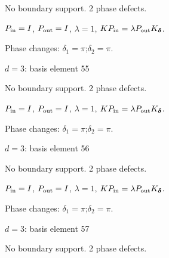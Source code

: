 No boundary support. 2 phase defects.
\begin{center}
\end{center}
\vspace{-1mm}
$P_{\rm in}=I$, \quad $P_{\rm out}=I$, \quad $\lambda=1$, \qquad $K P_{\rm in}=\lambda P_{\rm out}K_{\boldsymbol\delta}$.
\par\smallskip\begin{minipage}{.98\linewidth}\small Phase changes: $\delta_{1}=\pi$;\quad $\delta_{2}=\pi$.\end{minipage}
\vfill
{\footnotesize\texttt{}}
\newpage
{}
{\Large $d=3$: basis element 55}\par
No boundary support. 2 phase defects.
\begin{center}
\end{center}
\vspace{-1mm}
$P_{\rm in}=I$, \quad $P_{\rm out}=I$, \quad $\lambda=1$, \qquad $K P_{\rm in}=\lambda P_{\rm out}K_{\boldsymbol\delta}$.
\par\smallskip\begin{minipage}{.98\linewidth}\small Phase changes: $\delta_{1}=\pi$;\quad $\delta_{2}=\pi$.\end{minipage}
\vfill
{\footnotesize\texttt{}}
\newpage
{}
{\Large $d=3$: basis element 56}\par
No boundary support. 2 phase defects.
\begin{center}
\end{center}
\vspace{-1mm}
$P_{\rm in}=I$, \quad $P_{\rm out}=I$, \quad $\lambda=1$, \qquad $K P_{\rm in}=\lambda P_{\rm out}K_{\boldsymbol\delta}$.
\par\smallskip\begin{minipage}{.98\linewidth}\small Phase changes: $\delta_{1}=\pi$;\quad $\delta_{2}=\pi$.\end{minipage}
\vfill
{\footnotesize\texttt{}}
\newpage
{}
{\Large $d=3$: basis element 57}\par
No boundary support. 2 phase defects.
\begin{center}
\end{center}
